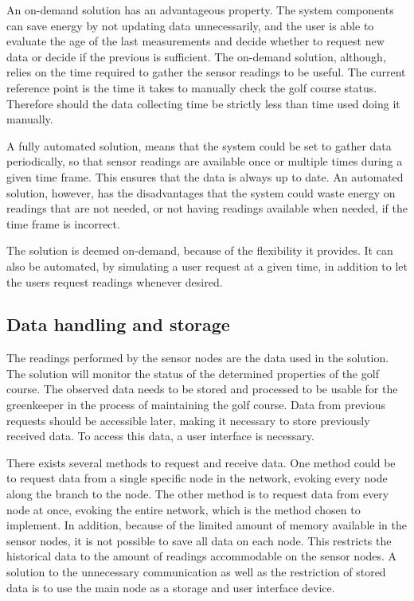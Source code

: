 An on-demand solution has an advantageous property. The system components can save energy by not updating data unnecessarily, and the user is able to evaluate the age of the last measurements and decide whether to request new data or decide if the previous is sufficient. The on-demand solution, although, relies on the time required to gather the sensor readings to be useful. The current reference point is the time it takes to manually check the golf course status. Therefore should the data collecting time be strictly less than time used doing it manually.

A fully automated solution, means that the system could be set to gather data periodically, so that sensor readings are available once or multiple times during a given time frame. This ensures that the data is always up to date. An automated solution, however, has the disadvantages that the system could waste energy on readings that are not needed, or not having readings available when needed, if the time frame is incorrect.

The solution is deemed on-demand, because of the flexibility it provides. It can also be automated, by simulating a user request at a given time, in addition to let the users request readings whenever desired.


\subsection{Data handling and storage}
The readings performed by the sensor nodes are the data used in the solution. The solution will monitor the status of the determined properties of the golf course. The observed data needs to be stored and processed to be usable for the greenkeeper in the process of maintaining the golf course. Data from previous requests should be accessible later, making it necessary to store previously received data. To access this data, a user interface is necessary. 

There exists several methods to request and receive data. One method could be to request data from a single specific node in the network, evoking every node along the branch to the node. The other method is to request data from every node at once, evoking the entire network, which is the method chosen to implement. In addition, because of the limited amount of memory available in the sensor nodes, it is not possible to save all data on each node. This restricts the historical data to the amount of readings accommodable on the sensor nodes. A solution to the unnecessary communication as well as the restriction of stored data is to use the main node as a storage and user interface device.

